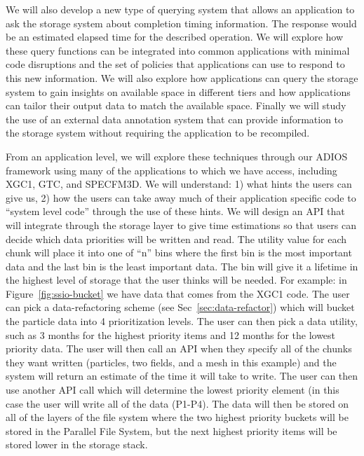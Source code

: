 We will also develop a new type of querying system that allows an application
to ask the storage system about completion timing information. The response
would be an estimated elapsed time for the described operation. We will explore
how these query functions can be integrated into common applications with
minimal code disruptions and the set of policies that applications can use to
respond to this new information. We will also explore how applications can
query the storage system to gain insights on available space in different tiers
and how applications can tailor their output data to match the available space.
Finally we will study the use of an external data annotation system that can
provide information to the storage system without requiring the application to
be recompiled. 

%
From an application level, we will explore these techniques through our ADIOS
framework using many of the applications to which we have access, including
XGC1, GTC, and SPECFM3D. We will understand: 1) what hints the users can give
us, 2) how the users can take away much of their application specific code to
``system level code'' through the use of these hints.  We will design an API
that will integrate through the storage layer to give time estimations so that
users can decide which data priorities will be written and read. The utility
value for each chunk will place it into one of ``n'' bins where the first bin
is the most important data and the last bin is the least important data. The
bin will give it a lifetime in the highest level of storage that the user thinks
will be needed. For example: in Figure~\ref{fig:ssio-bucket} we have data that
comes from the XGC1 code.  The user can pick a data-refactoring scheme (see
Sec~\ref{sec:data-refactor}) which will bucket the particle data into 4
prioritization levels.  The user can then pick a data utility, such as 3 months
for the highest priority items and 12 months for the lowest priority data.
The user will then call an API when they specify all of the chunks they want
written (particles, two fields, and a mesh in this example) and the system
will return an estimate of the time it will take to write. The user can then
use another API call which will determine the lowest priority element (in this
case the user will write all of the data (P1-P4). The data will then be stored
on all of the layers of the file system where the two highest priority buckets
will be stored in the Parallel File System, but the next highest priority items
will be stored lower in the storage stack. 
%


